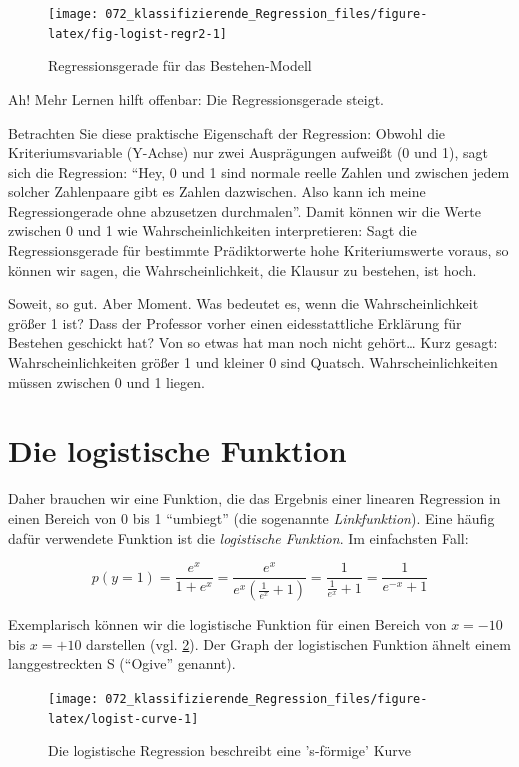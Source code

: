 \documentclass[12pt,ngerman,]{book}
\theoremstyle{definition}
\theoremstyle{definition}
\theoremstyle{remark}
\begin{document}
\begin{figure}

{\centering \texttt{[image: 072\_klassifizierende\_Regression\_files/figure-latex/fig-logist-regr2-1]} 

}

\caption{Regressionsgerade für das Bestehen-Modell}\label{fig:fig-logist-regr2}
\end{figure}

Ah! Mehr Lernen hilft offenbar: Die Regressionsgerade steigt.

Betrachten Sie diese praktische Eigenschaft der Regression: Obwohl die
Kriteriumsvariable (Y-Achse) nur zwei Ausprägungen aufweißt (0 und 1),
sagt sich die Regression: ``Hey, 0 und 1 sind normale reelle Zahlen und
zwischen jedem solcher Zahlenpaare gibt es Zahlen dazwischen. Also kann
ich meine Regressiongerade ohne abzusetzen durchmalen''. Damit können
wir die Werte zwischen 0 und 1 wie Wahrscheinlichkeiten interpretieren:
Sagt die Regressionsgerade für bestimmte Prädiktorwerte hohe
Kriteriumswerte voraus, so können wir sagen, die Wahrscheinlichkeit, die
Klausur zu bestehen, ist hoch.

Soweit, so gut. Aber Moment. Was bedeutet es, wenn die
Wahrscheinlichkeit größer 1 ist? Dass der Professor vorher einen
eidesstattliche Erklärung für Bestehen geschickt hat? Von so etwas hat
man noch nicht gehört\ldots{} Kurz gesagt: Wahrscheinlichkeiten größer 1
und kleiner 0 sind Quatsch. Wahrscheinlichkeiten müssen zwischen 0 und 1
liegen.

\section{Die logistische Funktion}\label{die-logistische-funktion}

Daher brauchen wir eine Funktion, die das Ergebnis einer linearen
Regression in einen Bereich von 0 bis 1 ``umbiegt'' (die sogenannte
\emph{Linkfunktion}). Eine häufig dafür verwendete Funktion ist die
\emph{logistische Funktion}. Im einfachsten
Fall:

\[p(y=1)=\frac{e^x}{1+e^x} = \frac{e^x}{e^x(\frac{1}{e^x}+1)}=\frac{1}{\frac{1}{e^x}+1}=\frac{1}{e^{-x}+1}\]

Exemplarisch können wir die logistische Funktion für einen Bereich von
\(x=-10\) bis \(x=+10\) darstellen (vgl. \ref{fig:logist-curve}). Der
Graph der logistischen Funktion ähnelt einem langgestreckten S
(``Ogive'' genannt).

\begin{figure}

{\centering \texttt{[image: 072\_klassifizierende\_Regression\_files/figure-latex/logist-curve-1]} 

}

\caption{Die logistische Regression beschreibt eine 's-förmige' Kurve}\label{fig:logist-curve}
\end{figure}
\end{document}
